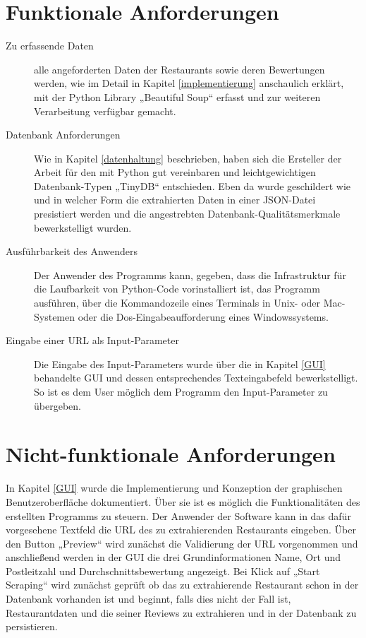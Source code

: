 \documentclass[a4paper,oneside,12pt]{report}
\begin{document}
		\section[Funktionale Anforderungen - Skanny Morandi]{Funktionale Anforderungen}

		\begin{description}
			\item[Zu erfassende Daten] alle angeforderten Daten der Restaurants sowie deren Bewertungen werden, wie im Detail in Kapitel \ref{implementierung} anschaulich erklärt, mit der Python Library „Beautiful Soup“ erfasst und zur weiteren Verarbeitung verfügbar gemacht.

			\item[Datenbank Anforderungen] Wie in Kapitel \ref{datenhaltung} beschrieben, haben sich die Ersteller der Arbeit für den mit Python gut vereinbaren und leichtgewichtigen Datenbank-Typen „TinyDB“ entschieden. Eben da wurde geschildert wie und in welcher Form die extrahierten Daten in einer JSON-Datei presistiert werden und die angestrebten Datenbank-Qualitätsmerkmale bewerkstelligt wurden.

			\item[Ausführbarkeit des Anwenders] Der Anwender des Programms kann, gegeben, dass die Infrastruktur für die Laufbarkeit von Python-Code vorinstalliert ist, das Programm ausführen, über die Kommandozeile eines Terminals in Unix- oder Mac-Systemen oder die Dos-Eingabeaufforderung eines Windowssystems.

			\item[Eingabe einer URL als Input-Parameter] Die Eingabe des Input-Parameters wurde über die in Kapitel \ref{GUI} behandelte GUI und dessen entsprechendes Texteingabefeld bewerkstelligt. So ist es dem User möglich dem Programm den Input-Parameter zu übergeben.

		\end{description}

		\section[Nicht-funktionale Anforderungen - Skanny Morandi]{Nicht-funktionale Anforderungen}
		In Kapitel \ref{GUI} wurde die Implementierung und Konzeption der graphischen Benutzeroberfläche dokumentiert. Über sie ist es möglich die Funktionalitäten des erstellten Programms zu steuern. Der Anwender der Software kann in das dafür vorgesehene Textfeld die URL des zu extrahierenden Restaurants eingeben. Über den Button „Preview“ wird zunächst die Validierung der URL vorgenommen und anschließend werden in der GUI die drei Grundinformationen Name, Ort und Postleitzahl und Durchschnittsbewertung angezeigt. Bei Klick auf „Start Scraping“ wird zunächst geprüft ob das zu extrahierende Restaurant schon in der Datenbank vorhanden ist und beginnt, falls dies nicht der Fall ist, Restaurantdaten und die seiner Reviews zu extrahieren und in der Datenbank zu persistieren.
\end{document}
